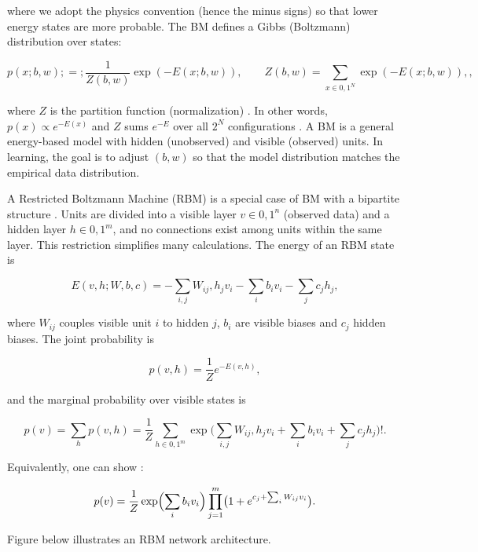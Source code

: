 where we adopt the physics convention (hence the minus signs) so that lower energy states are more probable.  The BM defines a Gibbs (Boltzmann) distribution over states:

$$

p(x; b,w) ;=; \frac{1}{Z(b,w)} \exp(-E(x; b,w)),

\qquad Z(b,w)=\sum_{x\in{0,1}^N} \exp(-E(x; b,w)),,

$$

where $Z$ is the partition function (normalization) .  In other words, $p(x)\propto e^{-E(x)}$ and $Z$ sums $e^{-E}$ over all $2^N$ configurations .  A BM is a general energy-based model with hidden (unobserved) and visible (observed) units. In learning, the goal is to adjust $(b,w)$ so that the model distribution matches the empirical data distribution.



A Restricted Boltzmann Machine (RBM) is a special case of BM with a bipartite structure .  Units are divided into a visible layer $v\in{0,1}^n$ (observed data) and a hidden layer $h\in{0,1}^m$, and no connections exist among units within the same layer. This restriction simplifies many calculations. The energy of an RBM state is

$$

E(v,h; W,b,c) = -\sum_{i,j} W_{ij},h_j v_i - \sum_i b_i v_i - \sum_j c_j h_j,

$$

where $W_{ij}$ couples visible unit $i$ to hidden $j$, $b_i$ are visible biases and $c_j$ hidden biases. The joint probability is

$$

p(v,h) = \frac{1}{Z} e^{-E(v,h)},

$$

and the marginal probability over visible states is

$$

p(v) = \sum_{h} p(v,h) = \frac{1}{Z} \sum_{h\in{0,1}^m} \exp\bigl(\sum_{i,j} W_{ij},h_j v_i + \sum_i b_i v_i + \sum_j c_j h_j\bigr)!.

$$

Equivalently, one can show :

$$

p(v) = \frac{1}{Z} \exp\Bigl(\sum_i b_i v_i\Bigr)\prod_{j=1}^m \bigl(1 + e^{c_j + \sum_i W_{ij}v_i}\bigr).

$$

Figure below illustrates an RBM network architecture.




